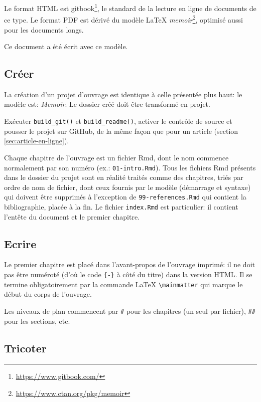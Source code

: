 \documentclass[
  12pt,
  french,
  a4paper,
  extrafontsizes,onecolumn,openright
  ]{memoir}
\begin{document}
Le format HTML est gitbook\footnote{\url{https://www.gitbook.com/}}, le standard de la lecture en ligne de documents de ce type.
Le format PDF est dérivé du modèle LaTeX \emph{memoir}\footnote{\url{https://www.ctan.org/pkg/memoir}}, optimisé aussi pour les documents longs.

Ce document a été écrit avec ce modèle.

\hypertarget{cruxe9er-1}{%
\subsection{Créer}\label{cruxe9er-1}}

La création d'un projet d'ouvrage est identique à celle présentée plus haut: le modèle est: \emph{Memoir}.
Le dossier créé doit être transformé en projet.

Exécuter \texttt{build\_git()} et \texttt{build\_readme()}, activer le contrôle de source et pousser le projet sur GitHub, de la même façon que pour un article (section \ref{sec:article-en-ligne}).

Chaque chapitre de l'ouvrage est un fichier Rmd, dont le nom commence normalement par son numéro (ex.: \texttt{01-intro.Rmd}).
Tous les fichiers Rmd présents dans le dossier du projet sont en réalité traités comme des chapitres, triés par ordre de nom de fichier, dont ceux fournis par le modèle (démarrage et syntaxe) qui doivent être supprimés à l'exception de \texttt{99-references.Rmd} qui contient la bibliographie, placée à la fin.
Le fichier \texttt{index.Rmd} est particulier: il contient l'entête du document et le premier chapitre.

\hypertarget{ecrire-2}{%
\subsection{Ecrire}\label{ecrire-2}}

Le premier chapitre est placé dans l'avant-propos de l'ouvrage imprimé: il ne doit pas être numéroté (d'où le code \texttt{\{-\}} à côté du titre) dans la version HTML.
Il se termine obligatoirement par la commande LaTeX \texttt{\textbackslash{}mainmatter} qui marque le début du corps de l'ouvrage.

Les niveaux de plan commencent par \texttt{\#} pour les chapitres (un seul par fichier), \texttt{\#\#} pour les sections, etc.

\hypertarget{tricoter-1}{%
\subsection{Tricoter}\label{tricoter-1}}
\end{document}
